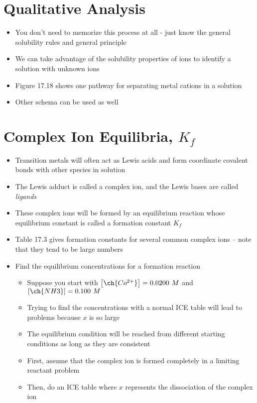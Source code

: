 \documentclass[12pt, openany, letterpaper]{memoir}
\begin{document}
\section{Qualitative Analysis}
\begin{itemize}
	\item You don't need to memorize this process at all - just know the general solubility rules and general principle
	\item We can take advantage of the solubility properties of ions to identify a solution with unknown ions
	\item Figure 17.18 shows one pathway for separating metal cations in a solution
	\item Other schema can be used as well
\end{itemize}
\section{Complex Ion Equilibria, $K_f$}
\begin{itemize}
	\item Transition metals will often act as Lewis acids and form coordinate covalent bonds with other species in solution
	\item The Lewis adduct is called a complex ion, and the Lewis bases are called \emph{ligands}
	\item These complex ions will be formed by an equilibrium reaction whose equilibrium constant is called a formation constant $K_f$
	\item Table 17.3 gives formation constants for several common complex ions -- note that they tend to be large numbers
	\item Find the equilibrium concentrations for a  formation reaction
	\begin{itemize}
		\item Suppose you start with $\left[\ch{Co^{2+}}\right]=0.0200~M$ and $\left[\ch{NH3}\right]=0.100~M$
		\item Trying to find the concentrations with a normal ICE table will lead to problems because $x$ is so large
		\item The equilibrium condition will be reached from different starting conditions as long as they are consistent
		\item First, assume that the complex ion is formed completely in a limiting reactant problem
		\item Then, do an ICE table where $x$ represents the dissociation of the complex ion
	\end{itemize}
\end{itemize}
\end{document}
